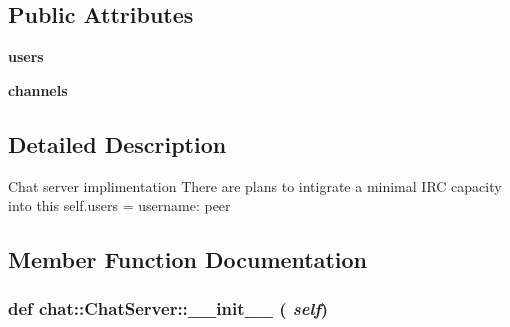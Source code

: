 \subsection*{Public Attributes}
\begin{DoxyCompactItemize}
\item 
\hypertarget{classchat_1_1ChatServer_aa578865668216e06f4f312a3524b9410}{
{\bfseries users}}
\label{classchat_1_1ChatServer_aa578865668216e06f4f312a3524b9410}

\item 
\hypertarget{classchat_1_1ChatServer_ac991d0d1a52246a1f40b2fbc9a6276d8}{
{\bfseries channels}}
\label{classchat_1_1ChatServer_ac991d0d1a52246a1f40b2fbc9a6276d8}

\end{DoxyCompactItemize}


\subsection{Detailed Description}
\begin{DoxyVerb}
Chat server implimentation
There are plans to intigrate a minimal IRC capacity into this
self.users = {username: peer}
\end{DoxyVerb}
 

\subsection{Member Function Documentation}
\hypertarget{classchat_1_1ChatServer_a983f009344e16e16bd811b941ef43e48}{
\subsubsection[{\_\-\_\-init\_\-\_\-}]{\setlength{\rightskip}{0pt plus 5cm}def chat::ChatServer::\_\-\_\-init\_\-\_\- ( {\em self})}}
\label{classchat_1_1ChatServer_a983f009344e16e16bd811b941ef43e48}
\begin{DoxyVerb}
\end{DoxyVerb}
 

